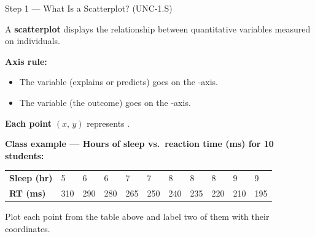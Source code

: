 \documentclass[10pt]{article}
\begin{document}
\begin{notesbox}{Step 1 --- What Is a Scatterplot? (UNC-1.S)}
\small

\noindent A \textbf{scatterplot} displays the relationship between \blank{3.5cm} quantitative
variables measured on \blank{3.5cm} individuals.

\vspace{6pt}
\textbf{Axis rule:}
\begin{itemize}[leftmargin=1.5em, itemsep=2pt]
  \item The \blank{3.5cm} variable (explains or predicts) goes on the \blank{1.5cm}-axis.
  \item The \blank{3.5cm} variable (the outcome) goes on the \blank{1.5cm}-axis.
\end{itemize}

\vspace{6pt}
\textbf{Each point} $(x,\, y)$ represents \blank{5.5cm}.

\vspace{6pt}
\textbf{Class example --- Hours of sleep vs.\ reaction time (ms) for 10 students:}

\vspace{6pt}
\renewcommand{\arraystretch}{1.5}
\begin{tabularx}{\linewidth}{@{} l *{10}{C{0.8cm}} @{}}
\textbf{Sleep (hr)} & 5 & 6 & 6 & 7 & 7 & 8 & 8 & 8 & 9 & 9 \\
\textbf{RT (ms)}    & 310 & 290 & 280 & 265 & 250 & 240 & 235 & 220 & 210 & 195 \\
\end{tabularx}

\vspace{10pt}
\begin{center}
\end{center}

\vspace{4pt}
Plot each point from the table above and label two of them with their coordinates.
\end{notesbox}
\end{document}
